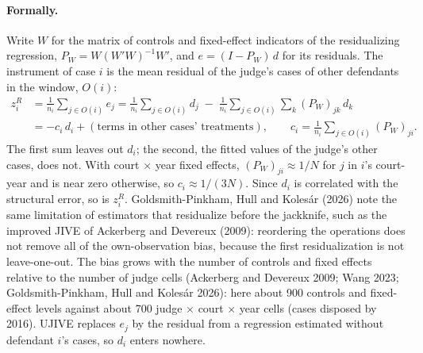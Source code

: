 \documentclass[11pt]{article}
\begin{document}
\paragraph{Formally.} Write $W$ for the matrix of controls and fixed-effect indicators of the residualizing regression, $P_W = W(W'W)^{-1}W'$, and $e = (I - P_W)\,d$ for its residuals. The instrument of case $i$ is the mean residual of the judge's cases of other defendants in the window, $O(i)$:
\begin{align*}
z^R_i &= \frac{1}{n_i}\sum_{j \in O(i)} e_j = \frac{1}{n_i}\sum_{j \in O(i)} d_j \;-\; \frac{1}{n_i}\sum_{j \in O(i)}\sum_k (P_W)_{jk}\, d_k \\
&= -c_i\, d_i + (\text{terms in other cases' treatments}), \qquad c_i = \frac{1}{n_i}\sum_{j \in O(i)} (P_W)_{ji}.
\end{align*}
The first sum leaves out $d_i$; the second, the fitted values of the judge's other cases, does not. With court $\times$ year fixed effects, $(P_W)_{ji} \approx 1/N$ for $j$ in $i$'s court-year and is near zero otherwise, so $c_i \approx 1/(3N)$. Since $d_i$ is correlated with the structural error, so is $z^R_i$. Goldsmith-Pinkham, Hull and Kolesár (2026) note the same limitation of estimators that residualize before the jackknife, such as the improved JIVE of Ackerberg and Devereux (2009): reordering the operations does not remove all of the own-observation bias, because the first residualization is not leave-one-out. The bias grows with the number of controls and fixed effects relative to the number of judge cells (Ackerberg and Devereux 2009; Wang 2023; Goldsmith-Pinkham, Hull and Kolesár 2026): here about 900 controls and fixed-effect levels against about 700 judge $\times$ court $\times$ year cells (cases disposed by 2016). UJIVE replaces $e_j$ by the residual from a regression estimated without defendant $i$'s cases, so $d_i$ enters nowhere.
\end{document}
